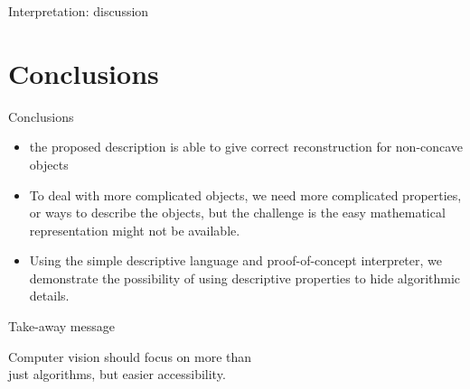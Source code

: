 \documentclass[10pt]{beamer}
\begin{document}
\begin{frame}{Interpretation: discussion}

\end{frame}

\section{Conclusions}
\begin{frame}{Conclusions}

\begin{itemize}
\item the proposed description is able to give correct reconstruction for non-concave objects
\item To deal with more complicated objects, we need more complicated properties, or ways to describe the objects, but the challenge is the easy mathematical representation might not be available.
\item Using the simple descriptive language and proof-of-concept interpreter, we demonstrate the possibility of using descriptive properties to hide algorithmic details.
\end{itemize}
\end{frame}

\begin{frame}[standout]{Take-away message}

Computer vision should focus on more than \\just algorithms, but easier accessibility.

\end{frame}
\end{document}
